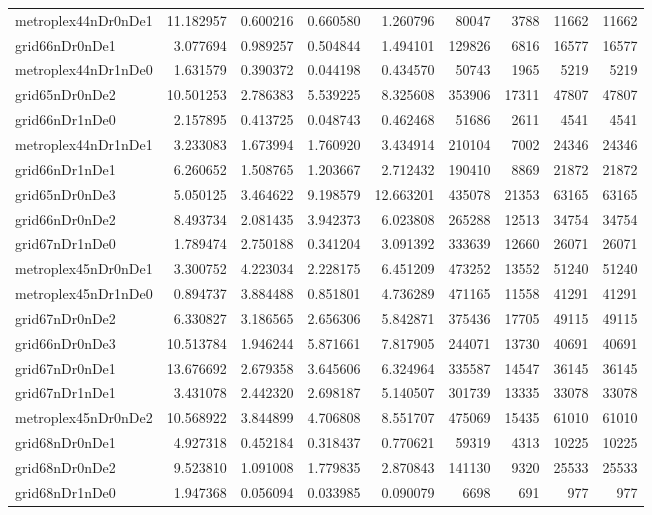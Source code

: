 \begin{longtable}{|l|r|r|r|r|r|r|r|r|}
metroplex44nDr0nDe1 & 11.182957 & 0.600216 & 0.660580 & 1.260796 & 80047 & 3788 & 11662 & 11662 \\
grid66nDr0nDe1 & 3.077694 & 0.989257 & 0.504844 & 1.494101 & 129826 & 6816 & 16577 & 16577 \\
metroplex44nDr1nDe0 & 1.631579 & 0.390372 & 0.044198 & 0.434570 & 50743 & 1965 & 5219 & 5219 \\
grid65nDr0nDe2 & 10.501253 & 2.786383 & 5.539225 & 8.325608 & 353906 & 17311 & 47807 & 47807 \\
grid66nDr1nDe0 & 2.157895 & 0.413725 & 0.048743 & 0.462468 & 51686 & 2611 & 4541 & 4541 \\
metroplex44nDr1nDe1 & 3.233083 & 1.673994 & 1.760920 & 3.434914 & 210104 & 7002 & 24346 & 24346 \\
grid66nDr1nDe1 & 6.260652 & 1.508765 & 1.203667 & 2.712432 & 190410 & 8869 & 21872 & 21872 \\
grid65nDr0nDe3 & 5.050125 & 3.464622 & 9.198579 & 12.663201 & 435078 & 21353 & 63165 & 63165 \\
grid66nDr0nDe2 & 8.493734 & 2.081435 & 3.942373 & 6.023808 & 265288 & 12513 & 34754 & 34754 \\
grid67nDr1nDe0 & 1.789474 & 2.750188 & 0.341204 & 3.091392 & 333639 & 12660 & 26071 & 26071 \\
metroplex45nDr0nDe1 & 3.300752 & 4.223034 & 2.228175 & 6.451209 & 473252 & 13552 & 51240 & 51240 \\
metroplex45nDr1nDe0 & 0.894737 & 3.884488 & 0.851801 & 4.736289 & 471165 & 11558 & 41291 & 41291 \\
grid67nDr0nDe2 & 6.330827 & 3.186565 & 2.656306 & 5.842871 & 375436 & 17705 & 49115 & 49115 \\
grid66nDr0nDe3 & 10.513784 & 1.946244 & 5.871661 & 7.817905 & 244071 & 13730 & 40691 & 40691 \\
grid67nDr0nDe1 & 13.676692 & 2.679358 & 3.645606 & 6.324964 & 335587 & 14547 & 36145 & 36145 \\
grid67nDr1nDe1 & 3.431078 & 2.442320 & 2.698187 & 5.140507 & 301739 & 13335 & 33078 & 33078 \\
metroplex45nDr0nDe2 & 10.568922 & 3.844899 & 4.706808 & 8.551707 & 475069 & 15435 & 61010 & 61010 \\
grid68nDr0nDe1 & 4.927318 & 0.452184 & 0.318437 & 0.770621 & 59319 & 4313 & 10225 & 10225 \\
grid68nDr0nDe2 & 9.523810 & 1.091008 & 1.779835 & 2.870843 & 141130 & 9320 & 25533 & 25533 \\
grid68nDr1nDe0 & 1.947368 & 0.056094 & 0.033985 & 0.090079 & 6698 & 691 & 977 & 977 \\

\end{longtable}
